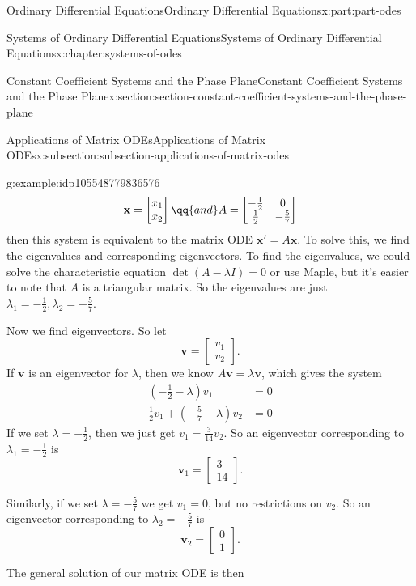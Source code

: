 \documentclass[oneside,10pt,]{book}
\numberwithin{equation}{part}
\renewcommand{\vec}[1]{\mathbf{#1}}
\newcommand{\amp}{&}
\begin{document}
\begin{partptx}{Ordinary Differential Equations}{}{Ordinary Differential Equations}{}{}{x:part:part-odes}
\begin{chapterptx}{Systems of Ordinary Differential Equations}{}{Systems of Ordinary Differential Equations}{}{}{x:chapter:systems-of-odes}
\begin{sectionptx}{Constant Coefficient Systems and the Phase Plane}{}{Constant Coefficient Systems and the Phase Plane}{}{}{x:section:section-constant-coefficient-systems-and-the-phase-plane}
\begin{subsectionptx}{Applications of Matrix ODEs}{}{Applications of Matrix ODEs}{}{}{x:subsection:subsection-applications-of-matrix-odes}
\begin{example}{}{g:example:idp105548779836576}
\begin{equation*}
\vec{x} = \begin{bmatrix} x_{1} \\ x_{2} \end{bmatrix} \qq{and} A = \begin{bmatrix}-\frac{1}{2} \amp  0 \\ \frac{1}{2} \amp  -\frac{5}{7}\end{bmatrix}
\end{equation*}
then this system is equivalent to the matrix ODE \(\vec{x}' = A\vec{x}\). To solve this, we find the eigenvalues and corresponding eigenvectors. To find the eigenvalues, we could solve the characteristic equation \(\det(A-\lambda I) = 0\) or use Maple, but it's easier to note that \(A\) is a triangular matrix. So the eigenvalues are just \(\lambda_{1} = -\frac{1}{2},\lambda_{2} = -\frac{5}{7}\).%
\par
Now we find eigenvectors. So let%
\begin{equation*}
\vec{v} = \begin{bmatrix}v_{1} \\ v_{2}\end{bmatrix}.
\end{equation*}
If \(\vec{v}\) is an eigenvector for \(\lambda\), then we know \(A\vec{v} = \lambda\vec{v}\), which gives the system%
\begin{align*}
(-\frac{1}{2}-\lambda)v_{1} \amp = 0\\
\frac{1}{2}v_{1} + (-\frac{5}{7}-\lambda)v_{2} \amp = 0
\end{align*}
If we set \(\lambda=-\frac{1}{2}\), then we just get \(v_{1} = \frac{3}{14}v_{2}\). So an eigenvector corresponding to \(\lambda_{1} = -\frac{1}{2}\) is%
\begin{equation*}
\vec{v}_{1} = \begin{bmatrix}3\\14\end{bmatrix}.
\end{equation*}
%
\par
Similarly, if we set \(\lambda=-\frac{5}{7}\) we get \(v_{1} = 0\), but no restrictions on \(v_{2}\). So an eigenvector corresponding to \(\lambda_{2} = -\frac{5}{7}\) is%
\begin{equation*}
\vec{v}_{2} = \begin{bmatrix}0\\1\end{bmatrix}.
\end{equation*}
%
\par
The general solution of our matrix ODE is then%

\end{example}
\end{subsectionptx}
\end{sectionptx}
\end{chapterptx}
\end{partptx}
\end{document}
